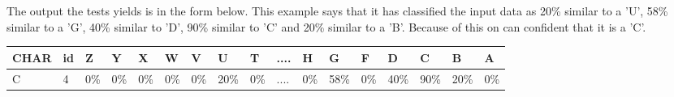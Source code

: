 The output the tests yields is in the form below. This example says that it has
classified the input data as 20\% similar to a 'U', 58\% similar to a 'G', 40\%
similar to 'D', 90\% similar to 'C' and 20\% similar to a 'B'.
Because of this on can confident that it is a 'C'.
\begin{longtable}{
	p{} p{} p{} p{} 
	p{} p{} p{} p{} 
	p{} p{} p{} p{} 
	p{} p{} p{} p{} 
	p{}
}
CHAR&id&Z&Y&X&W&V&U&T&....&H&G&F&D&C&B&A\\\hline
C&4&0\%&0\%&0\%&0\%&0\%&20\%&0\%&....&0\%&58\%&0\%&40\%&90\%&20\%&0\%\\

\end{longtable}


